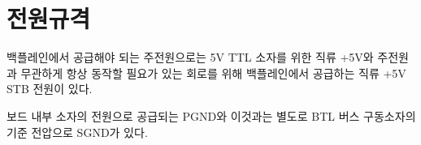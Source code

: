\section{전원규격}
백플레인에서 공급해야 되는 주전원으로는 5V TTL 소자를 위한 직류 +5V와
주전원과 무관하게 항상 동작할 필요가 있는 회로를 위해 백플레인에서 공급하는
직류 +5V STB 전원이 있다.

보드 내부 소자의 전원으로 공급되는 PGND와 이것과는 별도로 BTL 버스 구동소자의
기준 전압으로 SGND가 있다.

%
